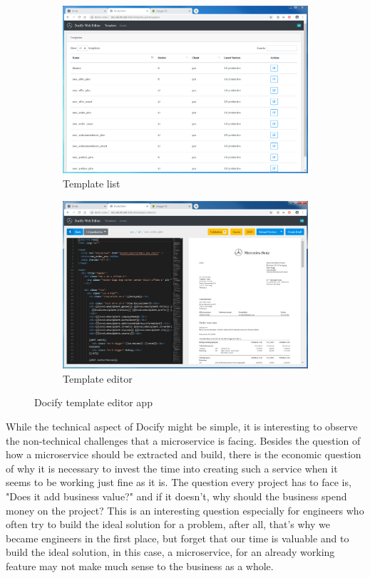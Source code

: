 \begin{figure}
  \begin{subfigure}[b]{0.5\linewidth}
    \includegraphics[width=\linewidth]{assets/docify-template-list.png}
    \caption{Template list}
    \label{fig:docify:a}
  \end{subfigure}
  \begin{subfigure}[b]{0.5\linewidth}
    \includegraphics[width=\linewidth]{assets/docify-editor.png}
    \caption{Template editor}
    \label{fig:docify:b}
  \end{subfigure}
  \caption{Docify template editor app}
  \label{fig:docify}
\end{figure}

While the technical aspect of Docify might be simple, it is interesting to observe the non-technical challenges that a microservice is facing. Besides the question of how a microservice should be extracted and build, there is the economic question of why it is necessary to invest the time into creating such a service when it seems to be working just fine as it is. The question every project has to face is, "Does it add business value?" and if it doesn't, why should the business spend money on the project? This is an interesting question especially for engineers who often try to build the ideal solution for a problem, after all, that's why we became engineers in the first place, but forget that our time is valuable and to build the ideal solution, in this case, a microservice, for an already working feature may not make much sense to the business as a whole.

